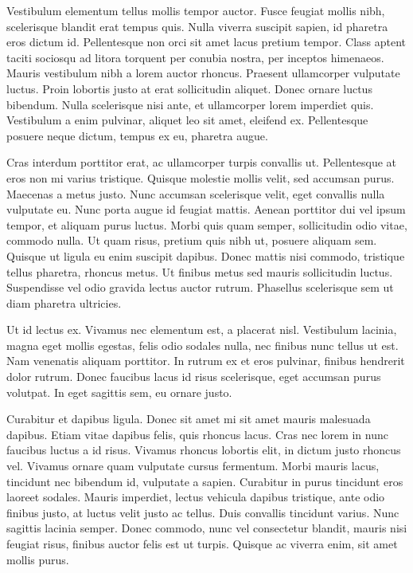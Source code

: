 Vestibulum elementum tellus mollis tempor auctor. Fusce feugiat mollis nibh, scelerisque blandit erat tempus quis. Nulla viverra suscipit sapien, id pharetra eros dictum id. Pellentesque non orci sit amet lacus pretium tempor. Class aptent taciti sociosqu ad litora torquent per conubia nostra, per inceptos himenaeos. Mauris vestibulum nibh a lorem auctor rhoncus. Praesent ullamcorper vulputate luctus. Proin lobortis justo at erat sollicitudin aliquet. Donec ornare luctus bibendum. Nulla scelerisque nisi ante, et ullamcorper lorem imperdiet quis. Vestibulum a enim pulvinar, aliquet leo sit amet, eleifend ex. Pellentesque posuere neque dictum, tempus ex eu, pharetra augue.

Cras interdum porttitor erat, ac ullamcorper turpis convallis ut. Pellentesque at eros non mi varius tristique. Quisque molestie mollis velit, sed accumsan purus. Maecenas a metus justo. Nunc accumsan scelerisque velit, eget convallis nulla vulputate eu. Nunc porta augue id feugiat mattis. Aenean porttitor dui vel ipsum tempor, et aliquam purus luctus. Morbi quis quam semper, sollicitudin odio vitae, commodo nulla. Ut quam risus, pretium quis nibh ut, posuere aliquam sem. Quisque ut ligula eu enim suscipit dapibus. Donec mattis nisi commodo, tristique tellus pharetra, rhoncus metus. Ut finibus metus sed mauris sollicitudin luctus. Suspendisse vel odio gravida lectus auctor rutrum. Phasellus scelerisque sem ut diam pharetra ultricies.

Ut id lectus ex. Vivamus nec elementum est, a placerat nisl. Vestibulum lacinia, magna eget mollis egestas, felis odio sodales nulla, nec finibus nunc tellus ut est. Nam venenatis aliquam porttitor. In rutrum ex et eros pulvinar, finibus hendrerit dolor rutrum. Donec faucibus lacus id risus scelerisque, eget accumsan purus volutpat. In eget sagittis sem, eu ornare justo.

Curabitur et dapibus ligula. Donec sit amet mi sit amet mauris malesuada dapibus. Etiam vitae dapibus felis, quis rhoncus lacus. Cras nec lorem in nunc faucibus luctus a id risus. Vivamus rhoncus lobortis elit, in dictum justo rhoncus vel. Vivamus ornare quam vulputate cursus fermentum. Morbi mauris lacus, tincidunt nec bibendum id, vulputate a sapien. Curabitur in purus tincidunt eros laoreet sodales. Mauris imperdiet, lectus vehicula dapibus tristique, ante odio finibus justo, at luctus velit justo ac tellus. Duis convallis tincidunt varius. Nunc sagittis lacinia semper. Donec commodo, nunc vel consectetur blandit, mauris nisi feugiat risus, finibus auctor felis est ut turpis. Quisque ac viverra enim, sit amet mollis purus.

